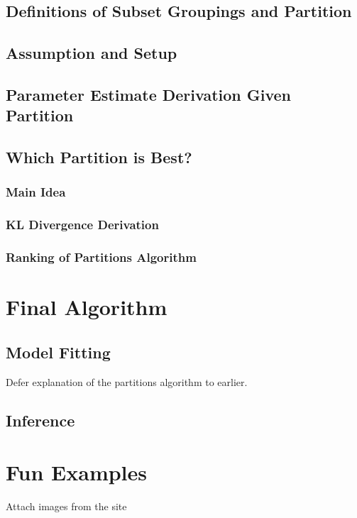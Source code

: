 \documentclass{article}
\begin{document}
\subsection{Definitions of Subset Groupings and Partition}
\subsection{Assumption and Setup}
\subsection{Parameter Estimate Derivation Given Partition}
\subsection{Which Partition is Best?}
\subsubsection{Main Idea}
\subsubsection{KL Divergence Derivation}
\subsubsection{Ranking of Partitions Algorithm}

\section{Final Algorithm}
\subsection{Model Fitting}
Defer explanation of the partitions algorithm to earlier.
\subsection{Inference}

\section{Fun Examples}
Attach images from the site
\end{document}
